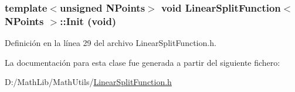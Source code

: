 \hypertarget{class_linear_split_function_acf02ce0cabe58189cbea47c03e468c57}{
\subsubsection[{Init}]{\setlength{\rightskip}{0pt plus 5cm}template$<$unsigned NPoints$>$ void {\bf LinearSplitFunction}$<$ NPoints $>$::Init (void)}}
\label{class_linear_split_function_acf02ce0cabe58189cbea47c03e468c57}


Definición en la línea 29 del archivo LinearSplitFunction.h.



La documentación para esta clase fue generada a partir del siguiente fichero:\begin{DoxyCompactItemize}
\item 
D:/MathLib/MathUtils/\hyperlink{_linear_split_function_8h}{LinearSplitFunction.h}\end{DoxyCompactItemize}

